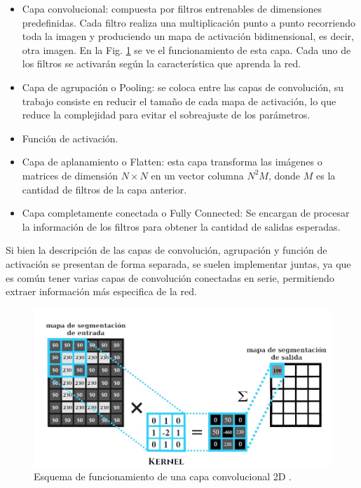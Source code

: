 \begin{itemize}
    \item Capa convolucional: compuesta por filtros entrenables de dimensiones predefinidas. Cada filtro realiza una multiplicación punto a punto recorriendo toda la imagen y produciendo un mapa de activación bidimensional, es decir, otra imagen.
          En la Fig. \ref{fig:esquema-capa-convolucional} se ve el funcionamiento de esta capa. Cada uno de los filtros se activarán según la característica que aprenda la red.
    \item Capa de agrupación o Pooling: se coloca entre las capas de convolución, su trabajo consiste en reducir el tamaño de cada mapa de activación, lo que reduce la complejidad para evitar el sobreajuste de los parámetros.
    \item Función de activación.
    \item Capa de aplanamiento o Flatten: esta capa transforma las imágenes o matrices de dimensión $N \times N$ en un vector columna $N^2M$, donde $M$ es la cantidad de filtros de la capa anterior.
    \item Capa completamente conectada o Fully Connected: Se encargan de procesar la información de los filtros para obtener la cantidad de salidas esperadas.
\end{itemize}

Si bien la descripción de las capas de convolución, agrupación y función de activación se presentan de forma separada, se suelen implementar juntas, ya que es común tener varias capas de convolución conectadas en serie, permitiendo extraer información más especifica de la red.

\begin{figure}[bth]
    \centering
    \includegraphics[width=.8\textwidth]{imgs/capa-convolucional.jpg}
    \caption{Esquema de funcionamiento de una capa convolucional 2D \cite{abril_redes_2021}.}
    \label{fig:esquema-capa-convolucional}
\end{figure}

